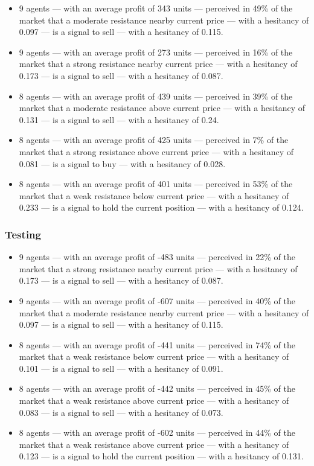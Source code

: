 {\small
  \begin{itemize}
  \item 9 agents — with an average profit of 343 units — perceived in 49\% of the market that a moderate resistance nearby current price — with a hesitancy of 0.097 — is a signal to sell — with a hesitancy of 0.115.
  \item 9 agents — with an average profit of 273 units — perceived in 16\% of the market that a strong resistance nearby current price — with a hesitancy of 0.173 — is a signal to sell — with a hesitancy of 0.087.
  \item 8 agents — with an average profit of 439 units — perceived in 39\% of the market that a moderate resistance above current price — with a hesitancy of 0.131 — is a signal to sell — with a hesitancy of 0.24.
  \item 8 agents — with an average profit of 425 units — perceived in 7\% of the market that a strong resistance above current price — with a hesitancy of 0.081 — is a signal to buy — with a hesitancy of 0.028.
  \item 8 agents — with an average profit of 401 units — perceived in 53\% of the market that a weak resistance below current price — with a hesitancy of 0.233 — is a signal to hold the current position — with a hesitancy of 0.124.
  \end{itemize}
}

\subsubsection{Testing}

{\small
  \begin{itemize}
  \item 9 agents — with an average profit of -483 units — perceived in 22\% of the market that a strong resistance nearby current price — with a hesitancy of 0.173 — is a signal to sell — with a hesitancy of 0.087.
  \item 9 agents — with an average profit of -607 units — perceived in 40\% of the market that a moderate resistance nearby current price — with a hesitancy of 0.097 — is a signal to sell — with a hesitancy of 0.115.
  \item 8 agents — with an average profit of -441 units — perceived in 74\% of the market that a weak resistance below current price — with a hesitancy of 0.101 — is a signal to sell — with a hesitancy of 0.091.
  \item 8 agents — with an average profit of -442 units — perceived in 45\% of the market that a weak resistance above current price — with a hesitancy of 0.083 — is a signal to sell — with a hesitancy of 0.073.
  \item 8 agents — with an average profit of -602 units — perceived in 44\% of the market that a weak resistance above current price — with a hesitancy of 0.123 — is a signal to hold the current position — with a hesitancy of 0.131.
  \end{itemize}
}

